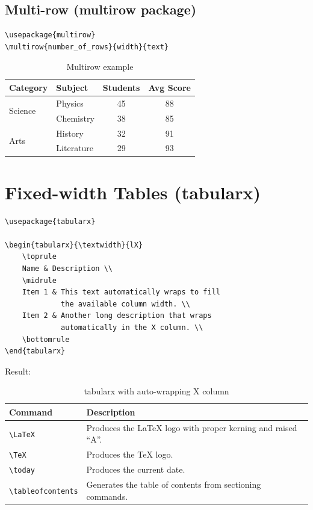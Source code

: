 \subsection{Multi-row (multirow package)}

\begin{lstlisting}[language={[LaTeX]TeX}, caption=Multirow]
\usepackage{multirow}
\multirow{number_of_rows}{width}{text}
\end{lstlisting}

\begin{table}[H]
\centering
\begin{tabular}{llcc}
\toprule
\textbf{Category} & \textbf{Subject} & \textbf{Students} & \textbf{Avg Score} \\
\midrule
\multirow{2}{*}{Science} & Physics  & 45 & 88 \\
                          & Chemistry & 38 & 85 \\
\midrule
\multirow{2}{*}{Arts}    & History  & 32 & 91 \\
                          & Literature & 29 & 93 \\
\bottomrule
\end{tabular}
\caption{Multirow example}
\end{table}

\section{Fixed-width Tables (tabularx)}

\begin{lstlisting}[language={[LaTeX]TeX}, caption=tabularx]
\usepackage{tabularx}

\begin{tabularx}{\textwidth}{lX}
    \toprule
    Name & Description \\
    \midrule
    Item 1 & This text automatically wraps to fill
             the available column width. \\
    Item 2 & Another long description that wraps
             automatically in the X column. \\
    \bottomrule
\end{tabularx}
\end{lstlisting}

Result:
\begin{table}[H]
\centering
\begin{tabularx}{0.9\textwidth}{lX}
\toprule
\textbf{Command} & \textbf{Description} \\
\midrule
\verb|\LaTeX|   & Produces the \LaTeX{} logo with proper kerning and raised ``A''. \\
\verb|\TeX|     & Produces the \TeX{} logo. \\
\verb|\today|   & Produces the current date. \\
\verb|\tableofcontents| & Generates the table of contents from sectioning commands. \\
\bottomrule
\end{tabularx}
\caption{tabularx with auto-wrapping X column}
\end{table}

